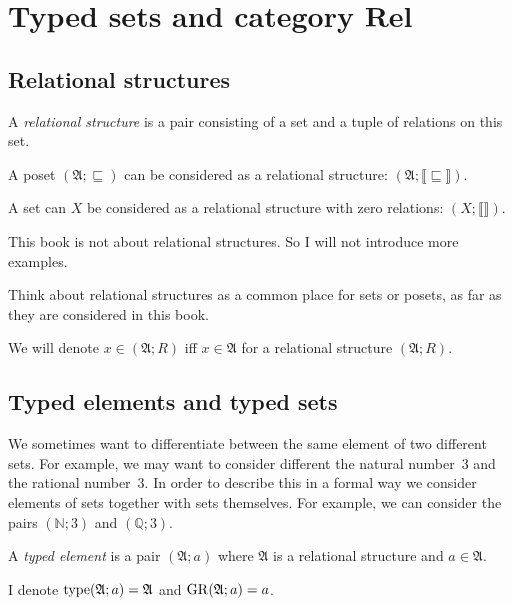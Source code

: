
\chapter{\texorpdfstring{Typed sets and category $\mathbf{Rel}$}%
{Typed sets and category Rel}}


\section{Relational structures}
\begin{defn}
A \emph{relational structure} is a pair
consisting of a set and a tuple of relations on this set.
\end{defn}
A poset $(\mathfrak{A};\sqsubseteq)$ can be considered as a relational
structure: $(\mathfrak{A};\llbracket\sqsubseteq\rrbracket).$

A set can $X$ be considered as a relational structure with zero relations:
$(X;\llbracket\rrbracket).$

This book is not about relational structures. So I will not introduce
more examples.

Think about relational structures as a common place for sets or posets,
as far as they are considered in this book.

We will denote $x\in(\mathfrak{A};R)$ iff $x\in\mathfrak{A}$ for
a relational structure $(\mathfrak{A};R)$.


\section{Typed elements and typed sets}

We sometimes want to differentiate between the same element of two
different sets. For example, we may want to consider different the
natural number~$3$ and the rational number~$3$. In order to describe
this in a formal way we consider elements of sets together with sets
themselves. For example, we can consider the pairs $(\mathbb{N};3)$
and $(\mathbb{Q};3)$.
\begin{defn}
A \emph{typed element}
is a pair $(\mathfrak{A};a)$ where $\mathfrak{A}$ is a relational
structure and $a\in\mathfrak{A}$.

I denote $\operatorname{type}(\mathfrak{A};a)=\mathfrak{A}$ and $\operatorname{GR}(\mathfrak{A};a)=a$.
\end{defn}

